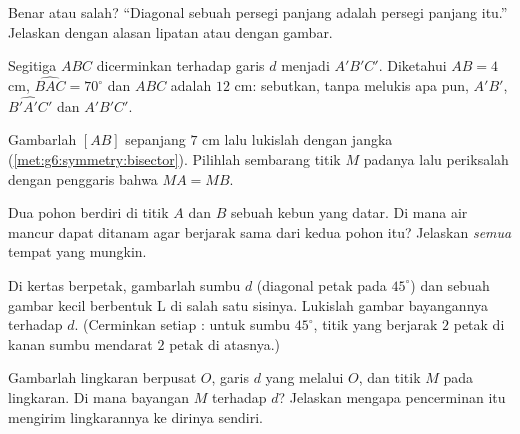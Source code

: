\begin{exercise}[$\star$]\label{exo:g6:symmetry:5}
Benar atau salah? ``Diagonal sebuah persegi panjang adalah  persegi panjang itu.'' Jelaskan dengan alasan lipatan atau dengan gambar.
\end{exercise}

\begin{exercise}[$\star$]\label{exo:g6:symmetry:6}
Segitiga $ABC$ dicerminkan terhadap garis $d$ menjadi $A'B'C'$.
Diketahui $AB = 4$ cm, $\widehat{BAC} = 70^\circ$ dan  $ABC$
adalah $12$ cm: sebutkan, tanpa melukis apa pun, $A'B'$,
$\widehat{B'A'C'}$ dan  $A'B'C'$.
\end{exercise}

\begin{exercise}[$\star$]\label{exo:g6:symmetry:7}
Gambarlah  $[AB]$ sepanjang $7$ cm lalu lukislah  dengan jangka (\cref{met:g6:symmetry:bisector}). Pilihlah
sembarang titik $M$ padanya lalu periksalah dengan penggaris bahwa $MA = MB$.
\end{exercise}

\begin{exercise}[$\star\star$]\label{exo:g6:symmetry:8}
Dua pohon berdiri di titik $A$ dan $B$ sebuah kebun yang datar. Di
mana air mancur dapat ditanam agar berjarak sama dari kedua pohon itu?
Jelaskan \emph{semua} tempat yang mungkin.
\end{exercise}

\begin{exercise}[$\star\star$]\label{exo:g6:symmetry:9}
Di kertas berpetak, gambarlah sumbu $d$ (diagonal petak pada
$45^\circ$) dan sebuah gambar kecil berbentuk L di salah satu sisinya.
Lukislah gambar bayangannya terhadap $d$. (Cerminkan setiap : untuk sumbu $45^\circ$, titik yang berjarak $2$ petak di kanan
sumbu mendarat $2$ petak di atasnya.)
\end{exercise}

\begin{exercise}[$\star\star$]\label{exo:g6:symmetry:10}
Gambarlah lingkaran berpusat $O$, garis $d$ yang melalui $O$, dan
titik $M$ pada lingkaran. Di mana bayangan $M$ terhadap $d$? Jelaskan
mengapa pencerminan itu mengirim lingkarannya ke dirinya sendiri.
\end{exercise}

